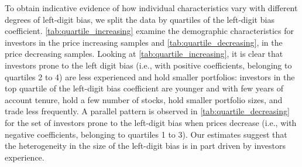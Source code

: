 To obtain indicative evidence of how individual characteristics vary with different degrees of left-digit bias, we split the data by quartiles of the left-digit bias coefficient. \ref{tab:quartile_increasing} examine the demographic characteristics for investors in the price increasing samples and \ref{tab:quartile_decreasing}, in the price decreasing samples. 
Looking at \ref{tab:quartile_increasing}, it is clear that investors prone to the left digit bias (i.e., with positive coefficients, belonging to quartiles 2 to 4) are less experienced and hold smaller portfolios: investors in the top quartile of the left-digit bias coefficient are younger and with few years of account tenure, hold a few number of stocks, hold smaller portfolio sizes, and trade less frequently. A parallel pattern is observed in \ref{tab:quartile_decreasing} for the set of investors prone to the left-digit bias when prices decrease (i.e., with negative coefficients, belonging to quartiles 1 to 3). Our estimates suggest that the heterogeneity in the size of the left-digit bias is in part driven by investors experience.





